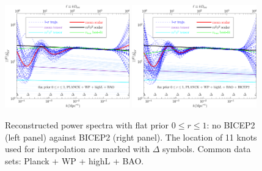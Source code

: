\documentclass[11pt]{article}
\def \halffigwidth{0.48\textwidth}
\begin{document}
\begin{figure}
  \includegraphics[width = \halffigwidth]{nobicep_spline0_p11_power_trajs.pdf}%
  \includegraphics[width = \halffigwidth]{spline0_p11_power_trajs.pdf}
\caption{Reconstructed power spectra with flat prior $0\le r\le 1$: no BICEP2 (left panel) against BICEP2 (right panel). The location of 11 knots used for interpolation are marked with $\Delta$ symbols. Common data sets: Planck + WP + highL + BAO. \label{fig:traj_bnb}}
\end{figure}
\end{document}
